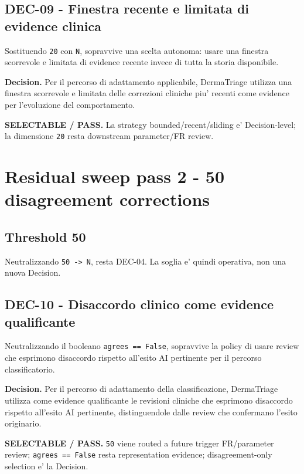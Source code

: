 \documentclass[11pt,a4paper]{article}
\begin{document}
\subsection{DEC-09 - Finestra recente e limitata di evidence clinica}
Sostituendo \texttt{20} con \texttt{N}, sopravvive una scelta autonoma: usare una finestra scorrevole e limitata di evidence recente invece di tutta la storia disponibile.

\textbf{Decision.} Per il percorso di adattamento applicabile, DermaTriage utilizza una finestra scorrevole e limitata delle correzioni cliniche piu' recenti come evidence per l'evoluzione del comportamento.

\begin{ddtacore}[title={Disposition}]
\textbf{SELECTABLE / PASS.} La strategy bounded/recent/sliding e' Decision-level; la dimensione \texttt{20} resta downstream parameter/FR review.
\end{ddtacore}

\section{Residual sweep pass 2 - 50 disagreement corrections}
\subsection{Threshold 50}
Neutralizzando \texttt{50 -> N}, resta DEC-04. La soglia e' quindi operativa, non una nuova Decision.

\subsection{DEC-10 - Disaccordo clinico come evidence qualificante}
Neutralizzando il booleano \texttt{agrees == False}, sopravvive la policy di usare review che esprimono disaccordo rispetto all'esito AI pertinente per il percorso classificatorio.

\textbf{Decision.} Per il percorso di adattamento della classificazione, DermaTriage utilizza come evidence qualificante le revisioni cliniche che esprimono disaccordo rispetto all'esito AI pertinente, distinguendole dalle review che confermano l'esito originario.

\begin{ddtacore}[title={Disposition}]
\textbf{SELECTABLE / PASS.} \texttt{50} viene routed a future trigger FR/parameter review; \texttt{agrees == False} resta representation evidence; disagreement-only selection e' la Decision.
\end{ddtacore}
\end{document}
